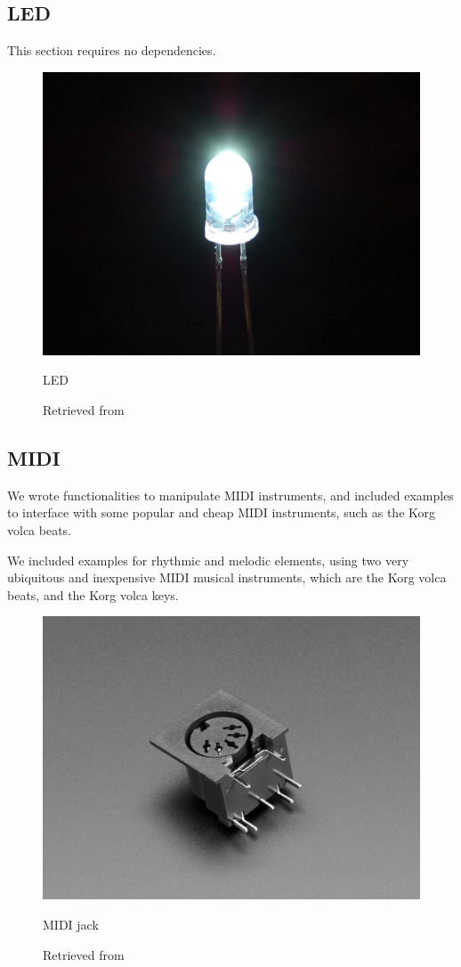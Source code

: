 \subsection{LED}

This section requires no dependencies.

\begin{figure}[ht]
  \centering
  \includegraphics[width=0.75\linewidth,height=0.25\textheight,keepaspectratio]{images/materials-adafruit-led.jpg}
  \caption{LED}
  \caption*{Retrieved from \cite{website-materials-adafruit-led}}
  \label{fig:materials-adafruit-led}
\end{figure}

\subsection{MIDI}

We wrote functionalities to manipulate MIDI instruments, and included examples to interface with some popular and cheap MIDI instruments, such as the Korg volca beats.

We included examples for rhythmic and melodic elements, using two very ubiquitous and inexpensive MIDI musical instruments, which are the Korg volca beats, and the Korg volca keys.

\begin{figure}[ht]
  \centering
  \includegraphics[width=0.75\linewidth,height=0.25\textheight,keepaspectratio]{images/materials-adafruit-midi-jack.jpg}
  \caption{MIDI jack}
  \caption*{Retrieved from \cite{website-materials-adafruit-midi-jack}}
  \label{fig:materials-adafruit-midi-jack}
\end{figure}

